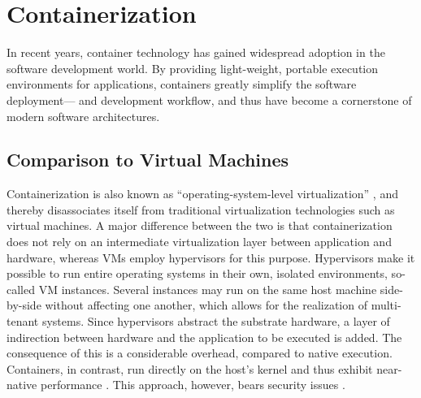
\section{Containerization}
In recent years, container technology has gained widespread adoption in the software development world. By providing light-weight, portable execution environments for applications, containers greatly simplify the software deployment— and development workflow, and thus have become a cornerstone of modern software architectures.

\subsection{Comparison to Virtual Machines}
Containerization is also known as ``operating-system-level virtualization'' \cite{soltesz2007container}, and thereby disassociates itself from traditional virtualization technologies such as virtual machines. A major difference between the two is that containerization does not rely on an intermediate virtualization layer between application and hardware, whereas VMs employ hypervisors for this purpose. Hypervisors make it possible to run entire operating systems in their own, isolated environments, so-called VM instances. Several instances may run on the same host machine side-by-side without affecting one another, which allows for the realization of multi-tenant systems. Since hypervisors abstract the substrate hardware, a layer of indirection between hardware and the application to be executed is added. The consequence of this is a considerable overhead, compared to native execution. Containers, in contrast, run directly on the host's kernel and thus exhibit near-native performance \cite{adufu2015container, felter2015updated, morabito2015hypervisors}. This approach, however, bears security issues \cite{xavier2013performance}.

